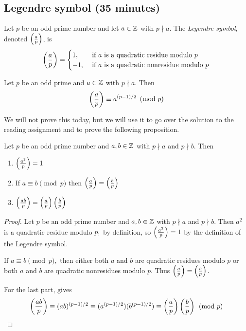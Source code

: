 \documentclass{ximera}
\begin{document}
\subsection{Legendre symbol (35 minutes)}

\begin{definition}\label{defn:legendre}
    Let $p$ be an odd prime number and let $a\in\mathbb Z$ with $p\nmid a$. The \emph{Legendre symbol}, denoted $\left(\frac{a}{p}\right)$, is
        \[
            \left(\frac{a}{p}\right)=
            \begin{cases}
                1, & \text{ if $a$ is a quadratic residue modulo $p$} \\
                -1, & \text{ if $a$ is a quadratic nonresidue modulo $p$} 
            \end{cases}
        \]
\end{definition}

\begin{theorem}\label{thm:euler-quads}
    Let $p$ be an odd prime and $a\in\mathbb Z$ with $p\nmid a.$ Then \[\left(\frac{a}{p}\right)\equiv a^{(p-1)/2}\pmod{p}\]
\end{theorem}

We will not prove this today, but we will use it to go over the solution to the reading assignment and to prove the following proposition.

\begin{proposition}[Proposition 4.5]\label{prop:legendre-facts}
	Let $p$ be an odd prime number and $a,b\in\mathbb Z$ with $p\nmid a$ and $p\nmid b.$ Then 
	\begin{enumerate}[label=(\alph*)]
		\item $\left(\frac{a^2}{p}\right)=1$ \label{squares-are-square}
		\item If $a\equiv b\pmod{p}$ then $\left(\frac{a}{p}\right)=\left(\frac{b}{p}\right)$ \label{legendre-respects-mod}
		\item $\left(\frac{ab}{p}\right)=\left(\frac{a}{p}\right)\left(\frac{b}{p}\right)$ \label{legendre-mult}
	\end{enumerate}
\end{proposition}


\begin{proof}
    Let $p$ be an odd prime number and $a,b\in\mathbb Z$ with $p\nmid a$ and $p\nmid b.$ Then $a^2$ is a quadratic residue modulo $p,$ by definition, so $\left(\frac{a^2}{p}\right)=1$ by the definition of the Legendre symbol.

    If $a\equiv b\pmod{p},$ then either both $a$ and $b$ are quadratic residues modulo $p$ or both $a$ and $b$ are quadratic nonresidues modulo $p.$ Thus $\left(\frac{a}{p}\right)=\left(\frac{b}{p}\right).$

    For the last part,  gives \[\left(\frac{ab}{p}\right)\equiv (ab)^{(p-1)/2}\equiv (a^{(p-1)/2})(b^{(p-1)/2})\equiv \left(\frac{a}{p}\right)\left(\frac{b}{p}\right)\pmod{p}\]
\end{proof}
\end{document}
